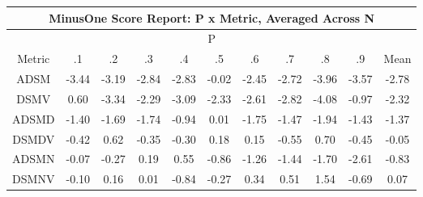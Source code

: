 \documentclass[11pt,a4paper]{report}
\begin{document}
\begin{longtable}{ | c || c | c | c | c | c | c | c | c | c || c |}
\hline
\multicolumn{11}{|c|}{ MinusOne Score Report: P x Metric, Averaged Across N } \\
\hline
\multicolumn{11}{|c|}{ P } \\
\hline
Metric & .1 & .2 & .3 & .4 & .5 & .6 & .7 & .8 & .9 & Mean\\
\hline
\hline
\endhead
ADSM &  \cellcolor[HTML]{FFA7A7} -3.44 &  \cellcolor[HTML]{FFAFAF} -3.19 &  \cellcolor[HTML]{FFB7B7} -2.84 &  \cellcolor[HTML]{FFB7B7} -2.83 &  \cellcolor[HTML]{FFFFFF} -0.02 &  \cellcolor[HTML]{FFBFBF} -2.45 &  \cellcolor[HTML]{FFB7B7} -2.72 &  \cellcolor[HTML]{FF9F9F} -3.96 &  \cellcolor[HTML]{FFA7A7} -3.57 &  \cellcolor[HTML]{FFB7B7} -2.78 \\
DSMV &  \cellcolor[HTML]{EFEFFF} 0.60 &  \cellcolor[HTML]{FFA7A7} -3.34 &  \cellcolor[HTML]{FFC7C7} -2.29 &  \cellcolor[HTML]{FFAFAF} -3.09 &  \cellcolor[HTML]{FFC7C7} -2.33 &  \cellcolor[HTML]{FFBFBF} -2.61 &  \cellcolor[HTML]{FFB7B7} -2.82 &  \cellcolor[HTML]{FF9797} -4.08 &  \cellcolor[HTML]{FFE7E7} -0.97 &  \cellcolor[HTML]{FFC7C7} -2.32 \\
ADSMD &  \cellcolor[HTML]{FFDFDF} -1.40 &  \cellcolor[HTML]{FFD7D7} -1.69 &  \cellcolor[HTML]{FFD7D7} -1.74 &  \cellcolor[HTML]{FFE7E7} -0.94 &  \cellcolor[HTML]{FFFFFF} 0.01 &  \cellcolor[HTML]{FFCFCF} -1.75 &  \cellcolor[HTML]{FFD7D7} -1.47 &  \cellcolor[HTML]{FFCFCF} -1.94 &  \cellcolor[HTML]{FFD7D7} -1.43 &  \cellcolor[HTML]{FFDFDF} -1.37 \\
DSMDV &  \cellcolor[HTML]{FFF7F7} -0.42 &  \cellcolor[HTML]{EFEFFF} 0.62 &  \cellcolor[HTML]{FFF7F7} -0.35 &  \cellcolor[HTML]{FFF7F7} -0.30 &  \cellcolor[HTML]{F7F7FF} 0.18 &  \cellcolor[HTML]{FFFFFF} 0.15 &  \cellcolor[HTML]{FFEFEF} -0.55 &  \cellcolor[HTML]{EFEFFF} 0.70 &  \cellcolor[HTML]{FFF7F7} -0.45 &  \cellcolor[HTML]{FFFFFF} -0.05 \\
ADSMN &  \cellcolor[HTML]{FFFFFF} -0.07 &  \cellcolor[HTML]{FFF7F7} -0.27 &  \cellcolor[HTML]{F7F7FF} 0.19 &  \cellcolor[HTML]{EFEFFF} 0.55 &  \cellcolor[HTML]{FFE7E7} -0.86 &  \cellcolor[HTML]{FFDFDF} -1.26 &  \cellcolor[HTML]{FFD7D7} -1.44 &  \cellcolor[HTML]{FFD7D7} -1.70 &  \cellcolor[HTML]{FFBFBF} -2.61 &  \cellcolor[HTML]{FFE7E7} -0.83 \\
DSMNV &  \cellcolor[HTML]{FFFFFF} -0.10 &  \cellcolor[HTML]{FFFFFF} 0.16 &  \cellcolor[HTML]{FFFFFF} 0.01 &  \cellcolor[HTML]{FFE7E7} -0.84 &  \cellcolor[HTML]{FFF7F7} -0.27 &  \cellcolor[HTML]{F7F7FF} 0.34 &  \cellcolor[HTML]{EFEFFF} 0.51 &  \cellcolor[HTML]{D7D7FF} 1.54 &  \cellcolor[HTML]{FFEFEF} -0.69 &  \cellcolor[HTML]{FFFFFF} 0.07 \\

\end{longtable}
\end{document}
